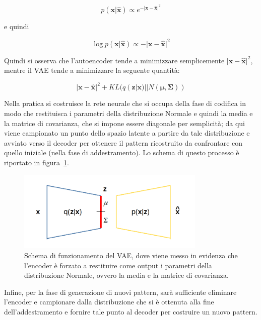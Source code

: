 \begin{equation}
	p(\textbf{x}|\hat{\textbf{x}}) \propto e^{{-{\lvert \textbf{x}-\hat{\textbf{x}}} \rvert}^2}
\end{equation}

e quindi

\begin{equation}
	\log p(\textbf{x}|\hat{\textbf{x}}) \propto -{\lvert \textbf{x}-\hat{\textbf{x}} \rvert}^2
\end{equation}

Quindi si osserva che l'autoencoder tende a minimizzare semplicemente ${\lvert \textbf{x}-\hat{\textbf{x}} \rvert}^2$, mentre il VAE tende a minimizzare la seguente quantità:

\begin{equation}
	{\lvert \textbf{x}-\hat{\textbf{x}} \rvert}^2 + KL (q(\textbf{z}|\textbf{x})||N(\bm{\mu},\bm{\Sigma}))
\end{equation}

Nella pratica si costruisce la rete neurale che si occupa della fase di codifica in modo che restituisca i parametri della distribuzione Normale e quindi la media e la matrice di covarianza, che si impone essere diagonale per semplicità; da qui viene campionato un punto dello spazio latente a partire da tale distribuzione e avviato verso il decoder per ottenere il pattern ricostruito da confrontare con quello iniziale (nella fase di addestramento). Lo schema di questo processo è riportato in figura~\ref{schemaVAEs}.
\newpage

\begin{figure}[h!]
	\centering		\includegraphics[width=0.80\textwidth]{figs/VAEgauss.png}
	\caption{Schema di funzionamento del VAE, dove viene messo in evidenza che l'encoder è forzato a restituire come output i parametri della distribuzione Normale, ovvero la media e la matrice di covarianza.}
	\label{schemaVAEs}
\end{figure}


Infine, per la fase di generazione di nuovi pattern, sarà sufficiente eliminare l'encoder e campionare dalla distribuzione che si è ottenuta alla fine dell'addestramento e fornire tale punto al decoder per costruire un nuovo pattern.



\newpage